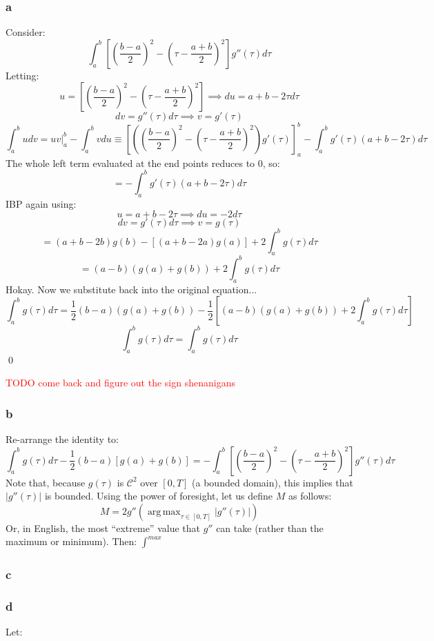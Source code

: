 \documentclass[11pt]{report}
\theoremstyle{definition}
\DeclareMathOperator*{\argmax}{arg\,max}
\begin{document}
\subsubsection*{a}
Consider:
\[
	\int_{a}^{b}\left[\left(\frac{b-a}{2}\right)^2-\left(\tau-\frac{a+b}{2}\right)^2\right]g''(\tau)d\tau
\]
Letting:
\[
	u=\left[\left(\frac{b-a}{2}\right)^2-\left(\tau-\frac{a+b}{2}\right)^2\right]
	\implies du = a+b-2\tau d\tau
\]
\[
	dv=g''(\tau)d\tau \implies v = g'(\tau)
\]
\[
	\int_{a}^{b}udv = uv|_a^b-\int_{a}^{b}vdu \equiv
	\left[\left(\left(\frac{b-a}{2}\right)^2-\left(\tau-\frac{a+b}{2}\right)^2\right)
		g'(\tau)
		\right]_a^b
	-\int_{a}^{b}g'(\tau)(a+b-2\tau)d\tau
\]
The whole left term evaluated at the end points reduces to $0$, so:
\[ = -\int_{a}^{b}g'(\tau)(a+b-2\tau)d\tau \]
IBP again using:
\[u = a+b-2\tau \implies du = -2d\tau\]
\[dv = g'(\tau)d\tau \implies v=g(\tau)\]
\[ = (a+b-2b)g(b)-\left[(a+b-2a)g(a)\right]+2\int_{a}^{b}g(\tau)d\tau \]
\[ = (a-b)(g(a)+g(b)) + 2\int_{a}^{b}g(\tau)d\tau\]
Hokay. Now we substitute back into the original equation...
\[
	\int_{a}^{b}g(\tau)d\tau = \frac{1}{2}(b-a)(g(a)+g(b))-\frac{1}{2}
	\left[ (a-b)(g(a)+g(b)) + 2\int_{a}^{b}g(\tau)d\tau \right]
\]
\[
	\int_{a}^{b}g(\tau)d\tau = \int_a^bg(\tau)d\tau
\]
\qed

\textcolor{red}{TODO come back and figure out the sign shenanigans}

\subsubsection*{b}
Re-arrange the identity to:
\[
	\int_a^bg(\tau)d\tau - \frac{1}{2}(b-a)[g(a)+g(b)] = -\int_a^b\left[
		\left(\frac{b-a}{2}\right)^2-\left(\tau - \frac{a+b}{2}\right)^2
		\right] g''(\tau)d\tau
\]
Note that, because $g(\tau)$ is $\mathcal{C}^2$ over $[0,T]$ (a bounded domain),
this implies that $|g''(\tau)|$ is bounded.
Using the power of foresight, let us define $M$ as follows:
\[M = 2g''\left(\argmax_{\tau\in[0,T]}|g''(\tau)|\right)\]
Or, in English, the most ``extreme'' value that $g''$ can take (rather than the
maximum or minimum). Then:
$\int_{}^{max}$

\subsubsection*{c}
\subsubsection*{d}
Let:
\[\]
\end{document}
